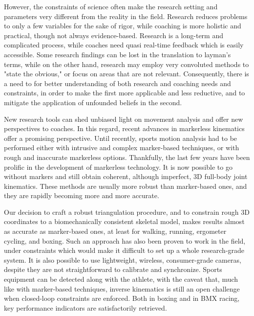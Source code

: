 However, the constraints of science often make the research setting and parameters very different from the reality in the field. 
Research reduces problems to only a few variables for the sake of rigor, while coaching is more holistic and practical, though not always evidence-based. 
Research is a long-term and complicated process, while coaches need quasi real-time feedback which is easily accessible. 
Some research findings can be lost in the translation to layman's terms, while on the other hand, research may employ very convoluted methods to "state the obvious," or focus on areas that are not relevant. 
Consequently, there is a need to for better understanding of both research and coaching needs and constraints, in order to make the first more applicable and less reductive, and to mitigate the application of unfounded beliefs in the second.

New research tools can shed unbiased light on movement analysis and offer new perspectives to coaches. In this regard, recent advances in markerless kinematics offer a promising perspective. Until recently, sports motion analysis had to be performed either with intrusive and complex marker-based techniques, or with rough and inaccurate markerless options. Thankfully, the last few years have been prolific in the development of markerless technology. It is now possible to go without markers and still obtain coherent, although imperfect, 3D full-body joint kinematics. These methods are usually more robust than marker-based ones, and they are rapidly becoming more and more accurate. 

Our decision to craft a robust triangulation procedure, and to constrain rough 3D coordinates to a biomechanically consistent skeletal model, makes results almost as accurate as marker-based ones, at least for walking, running, ergometer cycling, and boxing. Such an approach has also been proven to work in the field, under constraints which would make it difficult to set up a whole research-grade system. It is also possible to use lightweight, wireless, consumer-grade cameras, despite they are not straightforward to calibrate and synchronize. Sports equipment can be detected along with the athlete, with the caveat that, much like with marker-based techniques, inverse kinematics is still an open challenge when closed-loop constraints are enforced. Both in boxing and in BMX racing, key performance indicators are satisfactorily retrieved. 

